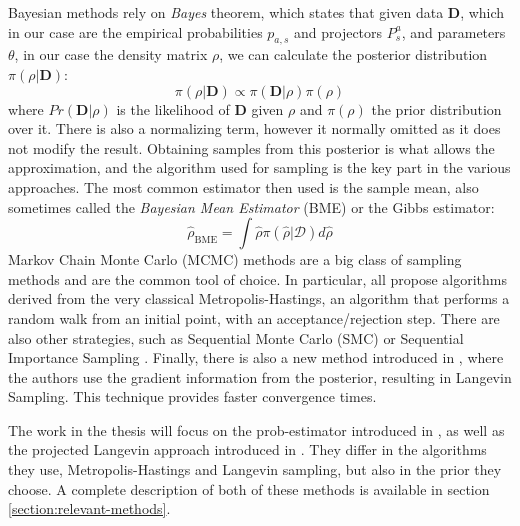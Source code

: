 \documentclass[12pt]{memoir}
\newcommand{\mb}{\mathbf}
\newcommand{\ti}{\textit}
\begin{document}
Bayesian methods rely on \ti{Bayes} theorem, which states that given data $\mb{D}$, which in our case are the empirical probabilities $p_{a,s}$ and projectors $P^a_s$, and parameters $\theta$, in our case the density matrix $\rho$, we can calculate the posterior distribution $\pi(\rho|\mb{D})$:
\begin{equation}
    \pi(\rho|\mb{D}) \propto \pi(\mb{D}|\rho) \pi(\rho)
\end{equation}
where $Pr(\mb{D}|\rho)$ is the likelihood of $\mb{D}$ given $\rho$ and $\pi(\rho)$ the prior distribution over it. There is also a normalizing term, however it normally omitted as it does not modify the result. Obtaining samples from this posterior is what allows the approximation, and the algorithm used for sampling is the key part in the various approaches. The most common estimator then used is the sample mean, also sometimes called the \ti{Bayesian Mean Estimator} (BME) or the Gibbs estimator:
\begin{equation}
    \hat \rho_{\text{BME}} = \int \hat \rho \pi(\hat \rho|\mathcal D) d\hat \rho
\end{equation}
Markov Chain Monte Carlo (MCMC) methods are a big class of sampling methods and are the common tool of choice. In particular, \cite{MA17,Mai22,LLJL20, meth:bayesian:mh:Blume-Kohout-2010} all propose algorithms derived from the very classical Metropolis-Hastings, an algorithm that performs a random walk from an initial point, with an acceptance/rejection step. There are also other strategies, such as Sequential Monte Carlo (SMC) \cite{meth:bayesian:smc:Ferrie-2014,meth:bayesian:smc:Kueng-2015, meth:bayesian:smc:Granade_2016} or Sequential Importance Sampling \cite{meth:bayesian:sis:Kravtsov-2013}. Finally, there is also a new method introduced in \cite{meth:bayesian:Langevin:ACMT2024}, where the authors use the gradient information from the posterior, resulting in Langevin Sampling. This technique provides faster convergence times.\medbreak

The work in the thesis will focus on the prob-estimator introduced in \cite{MA17}, as well as the projected Langevin approach introduced in \cite{meth:bayesian:Langevin:ACMT2024}. They differ in the algorithms they use, Metropolis-Hastings and Langevin sampling, but also in the prior they choose. A complete description of both of these methods is available in section \ref{section:relevant-methods}.

\end{document}
